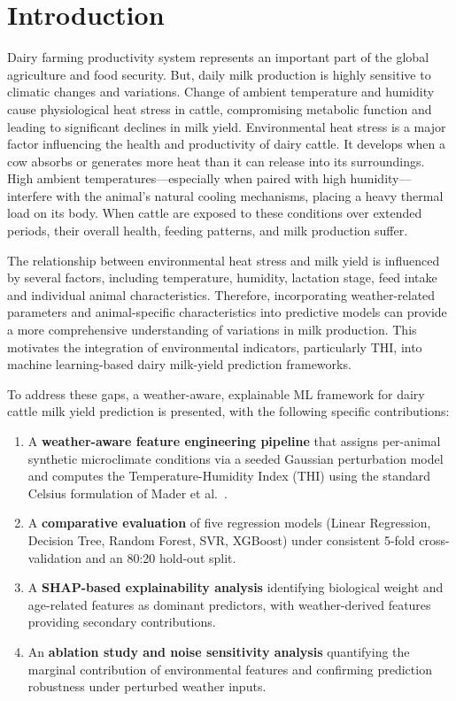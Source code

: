 \documentclass[conference]{IEEEtran}
\begin{document}
	\section{Introduction}
	Dairy farming productivity system represents an important part of the global agriculture and food security. But, daily milk production is highly sensitive to climatic changes and variations. Change of ambient temperature and humidity cause physiological heat stress in cattle, compromising metabolic function and leading to significant declines in milk yield. Environmental heat stress is a major factor influencing the health and productivity of dairy cattle. It develops when a cow absorbs or generates more heat than it can release into its surroundings. High ambient temperatures—especially when paired with high humidity—interfere with the animal's natural cooling mechanisms, placing a heavy thermal load on its body. When cattle are exposed to these conditions over extended periods, their overall health, feeding patterns, and milk production suffer.
	
	The relationship between environmental heat stress and milk yield is influenced by several factors, including temperature, humidity, lactation stage, feed intake and individual animal characteristics. Therefore, incorporating weather-related parameters and animal-specific characteristics into predictive models can provide a more comprehensive understanding of variations in milk production. This motivates the integration of environmental indicators, particularly THI, into machine learning-based dairy milk-yield prediction frameworks.
	
	To address these gaps, a weather-aware, explainable ML framework for dairy cattle milk yield prediction is presented, with the following specific contributions:
	\begin{enumerate}
		\item A \textbf{weather-aware feature engineering pipeline} that assigns per-animal synthetic microclimate conditions via a seeded Gaussian perturbation model and computes the Temperature-Humidity Index (THI) using the standard Celsius formulation of Mader et al.\ \cite{ref16}.
		\item A \textbf{comparative evaluation} of five regression models (Linear Regression, Decision Tree, Random Forest, SVR, XGBoost) under consistent 5-fold cross-validation and an 80:20 hold-out split.
		\item A \textbf{SHAP-based explainability analysis} identifying biological weight and age-related features as dominant predictors, with weather-derived features providing secondary contributions.
		\item An \textbf{ablation study and noise sensitivity analysis} quantifying the marginal contribution of environmental features and confirming prediction robustness under perturbed weather inputs.
	\end{enumerate}
	
\end{document}

